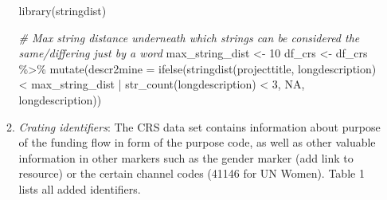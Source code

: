 \documentclass[
]{article}
\newenvironment{Shaded}{\begin{snugshade}}{\end{snugshade}}
\newcommand{\AttributeTok}[1]{\textcolor[rgb]{0.77,0.63,0.00}{#1}}
\newcommand{\CommentTok}[1]{\textcolor[rgb]{0.56,0.35,0.01}{\textit{#1}}}
\newcommand{\ConstantTok}[1]{\textcolor[rgb]{0.00,0.00,0.00}{#1}}
\newcommand{\DecValTok}[1]{\textcolor[rgb]{0.00,0.00,0.81}{#1}}
\newcommand{\FunctionTok}[1]{\textcolor[rgb]{0.00,0.00,0.00}{#1}}
\newcommand{\NormalTok}[1]{#1}
\newcommand{\OtherTok}[1]{\textcolor[rgb]{0.56,0.35,0.01}{#1}}
\newcommand{\SpecialCharTok}[1]{\textcolor[rgb]{0.00,0.00,0.00}{#1}}
\begin{document}
\begin{enumerate}
\begin{enumerate}
\begin{Shaded}
\begin{Highlighting}[]
\FunctionTok{library}\NormalTok{(stringdist)}

\CommentTok{\# Max string distance underneath which strings can be considered the same/differing just by a word}
\NormalTok{max\_string\_dist }\OtherTok{\textless{}{-}} \DecValTok{10} 
\NormalTok{df\_crs }\OtherTok{\textless{}{-}}\NormalTok{ df\_crs }\SpecialCharTok{\%\textgreater{}\%}
  \FunctionTok{mutate}\NormalTok{(}\AttributeTok{descr2mine =} \FunctionTok{ifelse}\NormalTok{(}\FunctionTok{stringdist}\NormalTok{(projecttitle, longdescription) }\SpecialCharTok{\textless{}}\NormalTok{ max\_string\_dist }\SpecialCharTok{|} \FunctionTok{str\_count}\NormalTok{(longdescription) }\SpecialCharTok{\textless{}} \DecValTok{3}\NormalTok{, }
                             \ConstantTok{NA}\NormalTok{, }
\NormalTok{                             longdescription))}
\end{Highlighting}
\end{Shaded}
  \item
    \emph{Crating identifiers}: The CRS data set contains information about purpose of the funding flow in form of the purpose code, as well as other valuable information in other markers such as the gender marker (add link to resource) or the certain channel codes (41146 for UN Women). Table 1 lists all added identifiers.


\end{enumerate}
\end{enumerate}
\end{document}
